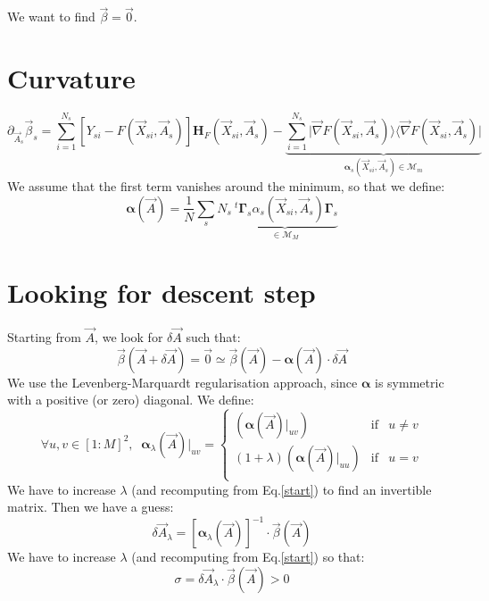 \documentclass[aps,12pt]{revtex4}
\newcommand{\trn}[1]{~^t{#1}}
\begin{document}
We want to find $\vec{\beta} = \vec{0}$.

\section{Curvature}
\begin{equation}
	\partial_{\vec{A}_s} \vec{\beta}_s = \sum_{i=1}^{N_s}  \left[ Y_{si} - F(\vec{X}_{si},\vec{A}_s) \right] \bm{H}_F(\vec{X}_{si},\vec{A}_s)
	- \underbrace{
	\sum_{i=1}^{N_s} \vert\vec{\nabla} F(\vec{X}_{si},\vec{A}_s) \rangle  \langle\vec{\nabla} F(\vec{X}_{si},\vec{A}_s)\vert
	}_{\bm{\alpha}_s(\vec{X}_{si},\vec{A}_s)\in\mathcal{M}_{m} }
\end{equation}
We assume that the first term vanishes around the minimum, so that we define:
\begin{equation}
	\bm{\alpha}(\vec{A}) = \dfrac{1}{N} \sum_s N_s \underbrace{\trn{\bm{\Gamma}_s} \alpha_s (\vec{X}_{si},\vec{A}_s) \bm{\Gamma}_s}_{\in \mathcal{M}_M}
\end{equation}

\section{Looking for descent step}

Starting from $\vec{A}$, we look for $\delta\vec{A}$ such that:
\begin{equation}
	\vec{\beta}(\vec{A}+\delta\vec{A}) = \vec{0} \simeq \vec{\beta}(\vec{A}) - \bm{\alpha}(\vec{A}) \cdot \delta \vec{A}
\end{equation}
We use the Levenberg-Marquardt regularisation approach, since $\bm{\alpha}$ is symmetric with a positive (or zero) diagonal.
We define:
\begin{equation}
\label{start}
\forall u,v \in [1:M]^2, \;\;
	\bm{\alpha}_{\lambda}(\vec{A})\vert_{uv} = 
	\left\lbrace
	\begin{array}{rcl}
	(\bm{\alpha}(\vec{A})\vert_{uv}) & \text{if} & u\not=v\\
	(1+\lambda)(\bm{\alpha}(\vec{A})\vert_{uu})  & \text{if} & u=v\\
	\end{array}
	\right.
\end{equation}
We have to increase $\lambda$ (and recomputing from Eq.\eqref{start}) to find an invertible matrix.
Then we have a guess:
\begin{equation}
	\delta\vec{A}_\lambda = \left[\bm{\alpha}_\lambda(\vec{A})\right]^{-1} \cdot \vec{\beta}(\vec{A})
\end{equation}
We have to increase $\lambda$ (and recomputing from Eq.\eqref{start}) so that:
\begin{equation}
	\sigma = \delta\vec{A}_\lambda \cdot \vec{\beta}(\vec{A}) > 0
\end{equation}
 
\end{document}
